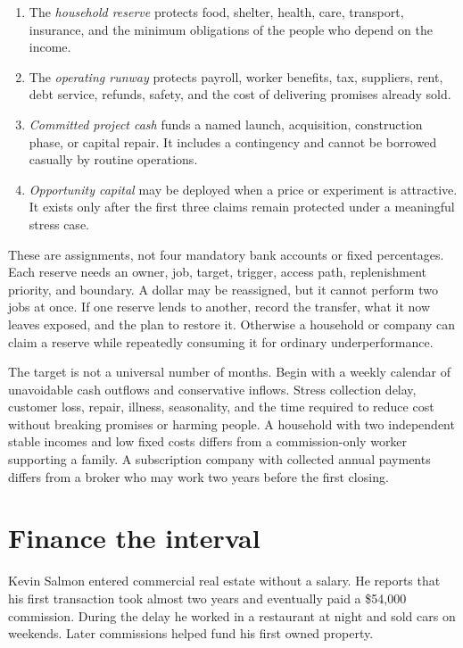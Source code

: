 \begin{enumerate}[itemsep=0.13em]
\item The \emph{household reserve} protects food, shelter, health, care,
  transport, insurance, and the minimum obligations of the people who depend
  on the income.
\item The \emph{operating runway} protects payroll, worker benefits, tax,
  suppliers, rent, debt service, refunds, safety, and the cost of delivering
  promises already sold.
\item \emph{Committed project cash} funds a named launch, acquisition,
  construction phase, or capital repair. It includes a contingency and cannot
  be borrowed casually by routine operations.
\item \emph{Opportunity capital} may be deployed when a price or experiment is
  attractive. It exists only after the first three claims remain protected
  under a meaningful stress case.
\end{enumerate}

These are assignments, not four mandatory bank accounts or fixed percentages.
Each reserve needs an owner, job, target, trigger, access path, replenishment
priority, and boundary. A dollar may be reassigned, but it cannot perform two
jobs at once. If one reserve lends to another, record the transfer, what it now
leaves exposed, and the plan to restore it. Otherwise a household or company
can claim a reserve while repeatedly consuming it for ordinary
underperformance.

The target is not a universal number of months. Begin with a weekly calendar
of unavoidable cash outflows and conservative inflows. Stress collection
delay, customer loss, repair, illness, seasonality, and the time required to
reduce cost without breaking promises or harming people. A household with two
independent stable incomes and low fixed costs differs from a commission-only
worker supporting a family. A subscription company with collected annual
payments differs from a broker who may work two years before the first closing.

\section{Finance the interval}

Kevin Salmon entered commercial real estate without a salary. He reports that
his first transaction took almost two years and eventually paid a \$54,000
commission. During the delay he worked in a restaurant at night and sold cars
on weekends. Later commissions helped fund his first owned property.

